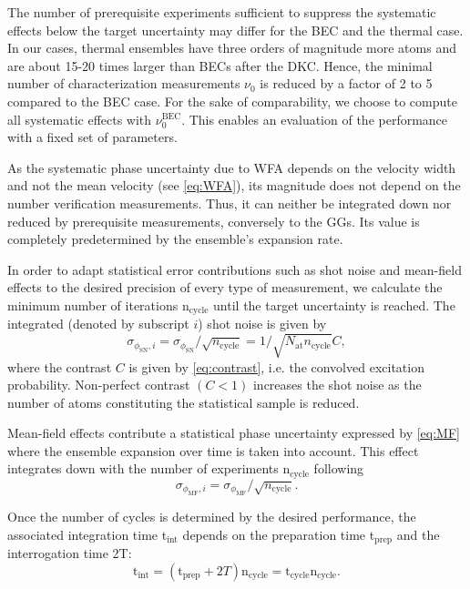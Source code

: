The number of prerequisite experiments sufficient to suppress the systematic effects below the target uncertainty may differ for the BEC and the thermal case. In our cases, thermal ensembles have three orders of magnitude more atoms and are about 15-20 times larger than BECs after the DKC. Hence, the minimal number of characterization measurements $\nu_0$ is reduced by a factor of 2 to 5 compared to the BEC case.
For the sake of comparability, we choose to compute all systematic effects with $\nu_0^\text{BEC}$. This enables an evaluation of the performance with a fixed set of parameters.

As the systematic phase uncertainty due to WFA depends on the velocity width and not the mean velocity (see \autoref{eq:WFA}), its magnitude does not depend on the number verification measurements. Thus, it can neither be integrated down nor reduced by prerequisite measurements, conversely to the GGs. Its value is completely predetermined by the ensemble's expansion rate.

In order to adapt statistical error contributions such as shot noise and mean-field effects to the desired precision of every type of measurement, we calculate the minimum number of iterations n$_\text{cycle}$ until the target uncertainty is reached. The integrated (denoted by subscript $i$) shot noise is given by 
\begin{equation}
    \label{eq:shot-noise}
    \sigma_{\phi_\text{SN},i}=\sigma_{\phi_\text{SN}}/\sqrt{n_\text{cycle}}=1/\sqrt{N_\text{at} n_\text{cycle}}C,
\end{equation}
where the contrast $C$ is given by \autoref{eq:contrast}, i.e. the convolved excitation probability. Non-perfect contrast $(C<1)$ increases the shot noise as the number of atoms constituting the statistical sample is reduced.

Mean-field effects contribute a statistical phase uncertainty expressed by \autoref{eq:MF} where the ensemble expansion over time is taken into account. This effect integrates down with the number of experiments n$_\text{cycle}$ following
\begin{equation}
    \sigma_{\phi_\text{MF},i}=\sigma_{\phi_\text{MF}}/\sqrt{n_\text{cycle}}.
\end{equation}

Once the number of cycles is determined by the desired performance, the associated integration time t$_\text{int}$ depends on the preparation time t$_\text{prep}$ and the interrogation time 2T:
\begin{equation}
    \label{eq:integration-time}
    \text{t}_\text{int}=\left(\text{t}_\text{prep}+2T\right)\text{n}_\text{cycle}=\text{t}_\text{cycle}\text{n}_\text{cycle}.
\end{equation}

